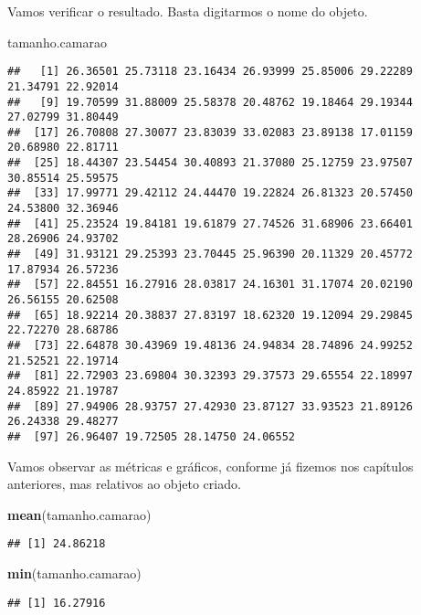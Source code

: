 \documentclass[titlepage, oneside, openany, a4paper]{book}
\newenvironment{Shaded}{\begin{snugshade}}{\end{snugshade}}
\newcommand{\KeywordTok}[1]{\textcolor[rgb]{0.13,0.29,0.53}{\textbf{#1}}}
\newcommand{\NormalTok}[1]{#1}
\begin{document}
Vamos verificar o resultado. Basta digitarmos o nome do objeto.

\begin{Shaded}
\begin{Highlighting}[]
\NormalTok{tamanho.camarao}
\end{Highlighting}
\end{Shaded}

\begin{verbatim}
##   [1] 26.36501 25.73118 23.16434 26.93999 25.85006 29.22289 21.34791 22.92014
##   [9] 19.70599 31.88009 25.58378 20.48762 19.18464 29.19344 27.02799 31.80449
##  [17] 26.70808 27.30077 23.83039 33.02083 23.89138 17.01159 20.68980 22.81711
##  [25] 18.44307 23.54454 30.40893 21.37080 25.12759 23.97507 30.85514 25.59575
##  [33] 17.99771 29.42112 24.44470 19.22824 26.81323 20.57450 24.53800 32.36946
##  [41] 25.23524 19.84181 19.61879 27.74526 31.68906 23.66401 28.26906 24.93702
##  [49] 31.93121 29.25393 23.70445 25.96390 20.11329 20.45772 17.87934 26.57236
##  [57] 22.84551 16.27916 28.03817 24.16301 31.17074 20.02190 26.56155 20.62508
##  [65] 18.92214 20.38837 27.83197 18.62320 19.12094 29.29845 22.72270 28.68786
##  [73] 22.64878 30.43969 19.48136 24.94834 28.74896 24.99252 21.52521 22.19714
##  [81] 22.72903 23.69804 30.32393 29.37573 29.65554 22.18997 24.85922 21.19787
##  [89] 27.94906 28.93757 27.42930 23.87127 33.93523 21.89126 26.24338 29.48277
##  [97] 26.96407 19.72505 28.14750 24.06552
\end{verbatim}

Vamos observar as métricas e gráficos, conforme já fizemos nos capítulos anteriores, mas relativos ao objeto criado.

\begin{Shaded}
\begin{Highlighting}[]
\KeywordTok{mean}\NormalTok{(tamanho.camarao)}
\end{Highlighting}
\end{Shaded}

\begin{verbatim}
## [1] 24.86218
\end{verbatim}

\begin{Shaded}
\begin{Highlighting}[]
\KeywordTok{min}\NormalTok{(tamanho.camarao)}
\end{Highlighting}
\end{Shaded}

\begin{verbatim}
## [1] 16.27916
\end{verbatim}
\end{document}
